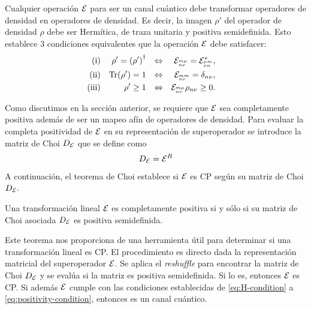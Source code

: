 Cualquier operación $\mathcal{E}$ para ser un canal cuántico debe transformar 
operadores de densidad en operadores de densidad. Es decir, la imagen 
$\rho'$ del operador de densidad $\rho$ debe ser Hermítica, de traza
unitaria y positiva semidefinida. Esto establece 3 condiciones equivalentes
que la operación $\mathcal{E}$ debe satisfacer:
\begin{align}
\text{(i)}&& \rho'=\qty(\rho')^{\dagger}&&\Leftrightarrow
    && \mathcal{E}_{{}^{m\mu}_{n\nu}}=\mathcal{E}_{{}^{\mu m}_{\nu n}}^*,&&
    \label{eq:H-condition}\\
\text{(ii)}&&\Tr(\rho')=1
    &&\Leftrightarrow&&  \mathcal{E}_{{}^{mm}_{n\nu}}=\delta_{n\nu},\\     
\text{(iii)}&&\rho'\geq1
    &&\Leftrightarrow&&  \mathcal{E}_{{}^{m\mu}_{n\nu}}\rho_{n\nu}\geq0.
    \label{eq:positivity-condition}
\end{align}



Como discutimos en la sección anterior, se requiere que $\mathcal{E}$ sea 
completamente positiva además de ser un mapeo afín de operadores de 
densidad. Para evaluar la completa positividad de $\mathcal{E}$ en su representación
de superoperador se introduce la matriz de Choi $D_{\mathcal{E}}$ que se define como
\cite{bengtsson_zyczkowski_2017}
\begin{align}
D_{\mathcal{E}}=\mathcal{E}^{R}
\end{align}
A continuación, el teorema de Choi \cite{bengtsson_zyczkowski_2017} 
establece si $\mathcal{E}$ es CP según su matriz de Choi $D_{\mathcal{E}}$.
\begin{teorema}
Una transformación lineal $\mathcal{E}$ es completamente positiva si y sólo si 
su matriz de Choi asociada $D_{\mathcal{E}}$ es positiva semidefinida.
\end{teorema}
Este teorema nos proporciona de una herramienta útil para determinar
si una transformación lineal es CP. El procedimiento es 
directo dada la representación matricial del superoperador $\mathcal{E}$. Se 
aplica el \textit{reshuffle} para encontrar la matriz de Choi $D_{\mathcal{E}}$
y se evalúa si la matriz es positiva semidefinida. Si lo es, entonces
$\mathcal{E}$ es CP. Si además $\mathcal{E}$ cumple con las condiciones establecidas de
\eqref{eq:H-condition} a \eqref{eq:positivity-condition}, entonces
es un canal cuántico.


